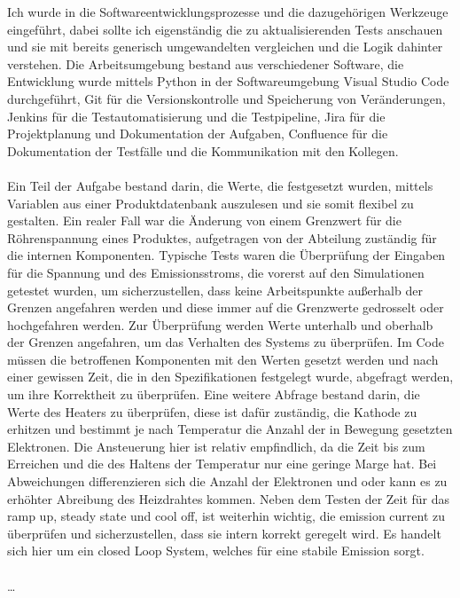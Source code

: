 \documentclass[12pt]{article} %
\begin{document}
Ich wurde in die Softwareentwicklungsprozesse und die dazugehörigen Werkzeuge eingeführt, dabei sollte ich eigenständig die zu aktualisierenden Tests anschauen und sie mit bereits generisch umgewandelten vergleichen und die Logik dahinter verstehen.
Die Arbeitsumgebung bestand aus verschiedener Software, die Entwicklung wurde mittels Python in der Softwareumgebung Visual Studio Code durchgeführt, Git für die Versionskontrolle und Speicherung von Veränderungen, Jenkins für die Testautomatisierung und die Testpipeline, Jira für die Projektplanung und Dokumentation der Aufgaben, Confluence für die Dokumentation der Testfälle und die Kommunikation mit den Kollegen.
\\
\\
Ein Teil der Aufgabe bestand darin, die Werte, die festgesetzt wurden, mittels Variablen aus einer Produktdatenbank auszulesen und sie somit flexibel zu gestalten. Ein realer Fall war die Änderung von einem Grenzwert für die Röhrenspannung eines Produktes, aufgetragen von der Abteilung zuständig für die internen Komponenten.
Typische Tests waren die Überprüfung der Eingaben für die Spannung und des Emissionsstroms, die vorerst auf den Simulationen getestet wurden, um sicherzustellen, dass keine Arbeitspunkte außerhalb der Grenzen angefahren werden und diese immer auf die Grenzwerte gedrosselt oder hochgefahren werden.
Zur Überprüfung werden Werte unterhalb und oberhalb der Grenzen angefahren, um das Verhalten des Systems zu überprüfen. Im Code müssen die betroffenen Komponenten mit den Werten gesetzt werden und nach einer gewissen Zeit, die in den Spezifikationen festgelegt wurde, abgefragt werden, um ihre Korrektheit zu überprüfen.
Eine weitere Abfrage bestand darin, die Werte des Heaters zu überprüfen, diese ist dafür zuständig, die Kathode zu erhitzen und bestimmt je nach Temperatur die Anzahl der in Bewegung gesetzten Elektronen. Die Ansteuerung hier ist relativ empfindlich, da die Zeit bis zum Erreichen und die des Haltens der Temperatur nur eine geringe Marge hat.
Bei Abweichungen differenzieren sich die Anzahl der Elektronen und oder kann es zu erhöhter Abreibung des Heizdrahtes kommen. Neben dem Testen der Zeit für das ramp up, steady state und cool off, ist weiterhin wichtig, die emission current zu überprüfen und sicherzustellen, dass sie intern korrekt geregelt wird. Es handelt sich hier um ein closed Loop System, welches für eine stabile Emission sorgt.
\\
\\
\dots
\\
\\
\end{document}
